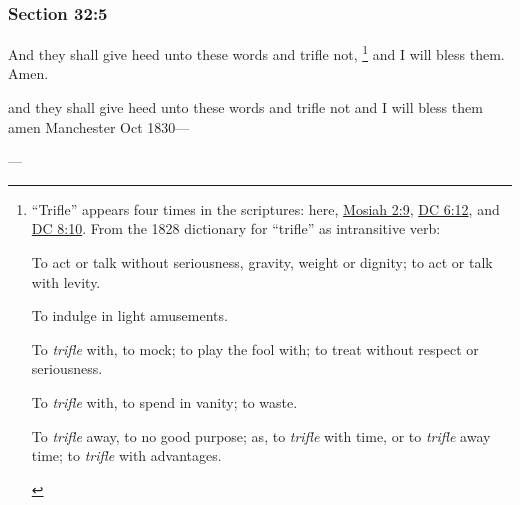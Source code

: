 	\subsubsection{Section 32:5} %
		\label{DC32-5}

		And they shall give heed unto these words and trifle not,%
			\footnote{%
				``Trifle'' appears four times in the scriptures: here, \hyperref[MOSIAH-2-9]{Mosiah 2:9}, \hyperref[DC6-12]{DC 6:12}, and \hyperref[DC8-10]{DC 8:10}. From the 1828 dictionary for ``trifle'' as intransitive verb:
					\begin{compactitem}
						\item To act or talk without seriousness, gravity, weight or dignity; to act or talk with levity.
						\item[1] To indulge in light amusements.
						\item To \textit{trifle} with, to mock; to play the fool with; to treat without respect or seriousness.
						\item To \textit{trifle} with, to spend in vanity; to waste.
						\item To \textit{trifle} away, to no good purpose; as, to \textit{trifle} with time, or to \textit{trifle} away time; to \textit{trifle} with advantages.
					\end{compactitem}
				}
		and I will bless them.  Amen.

		\begin{framed}
		\scriptsize
			\begin{compactdesc}
				\item[JSP] and they shall give heed unto these words and trifle not and I will bless them amen Manchester Oct 1830---
				\item[BC] ---
			\end{compactdesc}
		\end{framed}